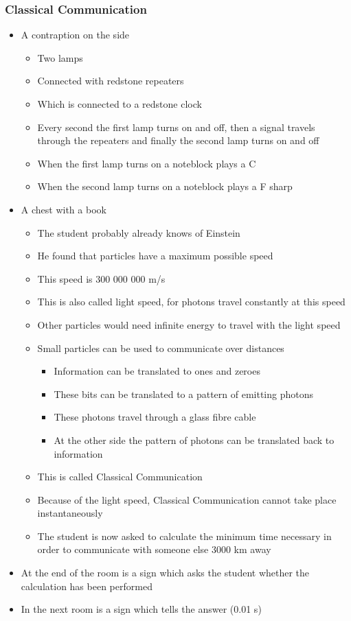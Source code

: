 \documentclass[11pt,twoside]{report} %
\begin{document}
\subsubsection{Classical Communication}
\begin{itemize}
	\item A contraption on the side
	\begin{itemize}
		\item Two lamps
		\item Connected with redstone repeaters
		\item Which is connected to a redstone clock
		\item Every second the first lamp turns on and off, then a signal travels through the repeaters and finally the second lamp turns on and off
		\item When the first lamp turns on a noteblock plays a C
		\item When the second lamp turns on a noteblock plays a F sharp
	\end{itemize}
	\item A chest with a book
	\begin{itemize}
		\item The student probably already knows of Einstein
		\item He found that particles have a maximum possible speed
		\item This speed is 300 000 000 m/s
		\item This is also called light speed, for photons travel constantly at this speed
		\item Other particles would need infinite energy to travel with the light speed
		\item Small particles can be used to communicate over distances
		\begin{itemize}
			\item Information can be translated to ones and zeroes
			\item These bits can be translated to a pattern of emitting photons
			\item These photons travel through a glass fibre cable
			\item At the other side the pattern of photons can be translated back to information
		\end{itemize}
		\item This is called Classical Communication
		\item Because of the light speed, Classical Communication cannot take place instantaneously
		\item The student is now asked to calculate the minimum time necessary in order to communicate with someone else 3000 km away
	\end{itemize}
	\item At the end of the room is a sign which asks the student whether the calculation has been performed
	\item In the next room is a sign which tells the answer (0.01 s)
\end{itemize}
\end{document}
